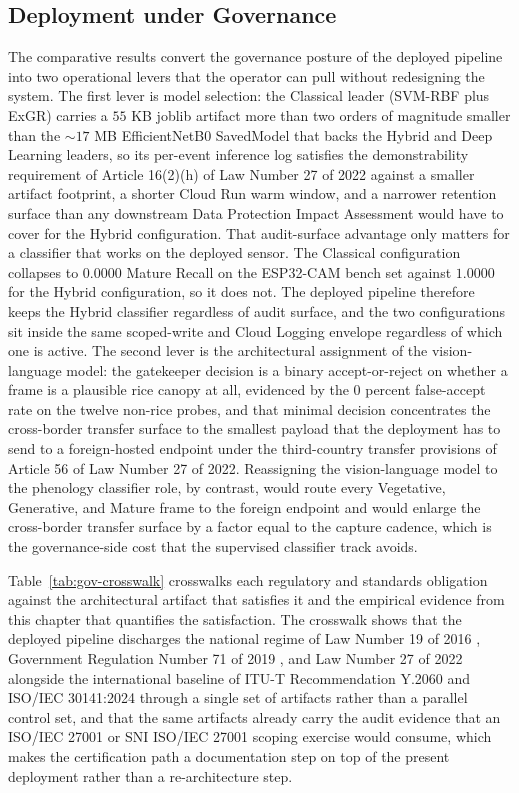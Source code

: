 \subsection{Deployment under Governance}

The comparative results convert the governance posture of the deployed pipeline into two operational levers that the operator can pull without redesigning the system. The first lever is model selection: the Classical leader (SVM-RBF plus ExGR) carries a $55$ KB joblib artifact more than two orders of magnitude smaller than the $\sim$$17$ MB EfficientNetB0 SavedModel that backs the Hybrid and Deep Learning leaders, so its per-event inference log satisfies the demonstrability requirement of Article 16(2)(h) of Law Number 27 of 2022 \cite{uupdp2022} against a smaller artifact footprint, a shorter Cloud Run warm window, and a narrower retention surface than any downstream Data Protection Impact Assessment would have to cover for the Hybrid configuration. That audit-surface advantage only matters for a classifier that works on the deployed sensor. The Classical configuration collapses to $0.0000$ Mature Recall on the ESP32-CAM bench set against $1.0000$ for the Hybrid configuration, so it does not. The deployed pipeline therefore keeps the Hybrid classifier regardless of audit surface, and the two configurations sit inside the same scoped-write and Cloud Logging envelope regardless of which one is active. The second lever is the architectural assignment of the vision-language model: the gatekeeper decision is a binary accept-or-reject on whether a frame is a plausible rice canopy at all, evidenced by the $0$ percent false-accept rate on the twelve non-rice probes, and that minimal decision concentrates the cross-border transfer surface to the smallest payload that the deployment has to send to a foreign-hosted endpoint under the third-country transfer provisions of Article 56 of Law Number 27 of 2022. Reassigning the vision-language model to the phenology classifier role, by contrast, would route every Vegetative, Generative, and Mature frame to the foreign endpoint and would enlarge the cross-border transfer surface by a factor equal to the capture cadence, which is the governance-side cost that the supervised classifier track avoids.

Table~\ref{tab:gov-crosswalk} crosswalks each regulatory and standards obligation against the architectural artifact that satisfies it and the empirical evidence from this chapter that quantifies the satisfaction. The crosswalk shows that the deployed pipeline discharges the national regime of Law Number 19 of 2016 \cite{uuite2016}, Government Regulation Number 71 of 2019 \cite{pp71_2019}, and Law Number 27 of 2022 alongside the international baseline of ITU-T Recommendation Y.2060 \cite{itut_y2060} and ISO/IEC 30141:2024 \cite{iso30141_2024} through a single set of artifacts rather than a parallel control set, and that the same artifacts already carry the audit evidence that an ISO/IEC 27001 or SNI ISO/IEC 27001 scoping exercise would consume, which makes the certification path a documentation step on top of the present deployment rather than a re-architecture step.

